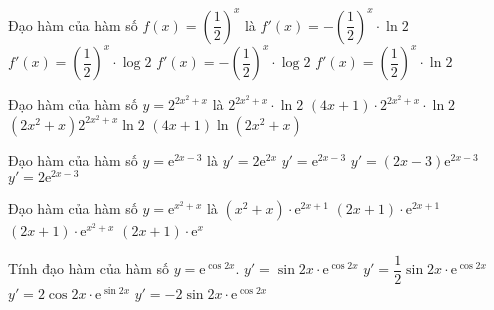 \begin{ex}%
	Đạo hàm của hàm số $ f( x )={\left( \dfrac{1}{2} \right)^x}$ là
	\choice
	{\True $f'( x )=-{{\left( \dfrac{1}{2} \right)}^x}\cdot \ln 2 $}
	{ $f'( x )={{\left( \dfrac{1}{2} \right)}^x}\cdot \log 2 $}
	{ $f'( x )=-{{\left( \dfrac{1}{2} \right)}^x}\cdot \log 2 $}
	{ $f'( x )={{\left( \dfrac{1}{2} \right)}^x}\cdot \ln 2 $}
\end{ex}
\begin{ex}%
	Đạo hàm của hàm số $y=2^{2x^2 + x}$ là
	\choice
	{$2^{2x^2 + x}\cdot\ln 2$}
	{\True $(4x + 1)\cdot 2^{2x^2 + x}\cdot\ln 2$}
	{ $\left(2x^2 + x\right) 2^{2x^2 + x}\ln 2$}
	{$(4x + 1)\ln \left(2x^2 + x\right)$}
\end{ex}
\begin{ex}%
	Đạo hàm của hàm số $ y={\mathrm{e}^{2x-3}}$ là
	\choice
	{ $y'=2{\mathrm{e}^{2x}}$}
	{ $y'={\mathrm{e}^{2x-3}}$}
	{ $y'=( 2x-3 ){\mathrm{e}^{2x-3}}$}
	{\True $y'=2{\mathrm{e}^{2x-3}}$}
\end{ex}
\begin{ex}%
	Đạo hàm của hàm số $y=\mathrm{e}^{x^2 + x}$ là
	\choice
	{$\left(x^2 + x\right)\cdot\mathrm{e}^{2x + 1}$}
	{$(2x + 1)\cdot\mathrm{e}^{2x + 1}$}
	{\True $(2x + 1)\cdot\mathrm{e}^{x^2 + x}$}
	{$(2x + 1)\cdot\mathrm{e}^x$}
\end{ex}
\begin{ex}%
	Tính đạo hàm của hàm số $y=\mathrm{e}^{\cos 2x}$.
	\choice
	{$y'=\sin 2x\cdot\mathrm{e}^{\cos 2x}$}
	{$y'=\dfrac{1}{2}\sin 2x\cdot\mathrm{e}^{\cos 2x}$}
	{ $y'=2\cos 2x\cdot\mathrm{e}^{\sin 2x}$}
	{\True $y'= - 2\sin 2x\cdot\mathrm{e}^{\cos 2x}$}
\end{ex}

